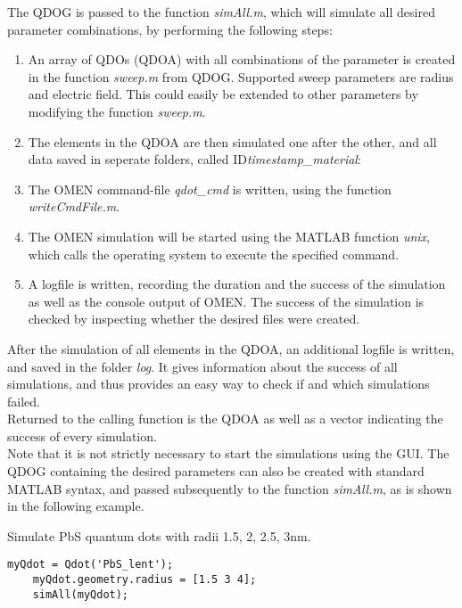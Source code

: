 The QDOG is passed to the function \textit{simAll.m}, which will simulate all desired parameter combinations, by performing the following steps:
\begin{enumerate}
	\item An array of QDOs (QDOA) with all combinations of the parameter is created in the function \textit{sweep.m} from QDOG. Supported sweep parameters are radius and electric field. This could easily be extended to other parameters by modifying the function \textit{sweep.m}.
	\item The elements in the QDOA are then simulated one after the other, and all data saved in seperate folders, called ID\textit{timestamp\_material}: 
	\item The OMEN command-file \textit{qdot\_cmd} is written, using the function \textit{writeCmdFile.m}.
	\item The OMEN simulation will be started using the MATLAB function \textit{unix}, which calls the operating system to execute the specified command.
	\item A logfile is written, recording the duration and the success of the simulation as well as the console output of OMEN. The success of the simulation is checked by inspecting whether the desired files were created.
\end{enumerate}
After the simulation of all elements in the QDOA, an additional logfile is written, and saved in the folder \textit{log}. It gives information about the success of all simulations, and thus provides an easy way to check if and which simulations failed.\\

Returned to the calling function is the QDOA as well as a vector indicating the success of every simulation.\\

Note that it is not strictly necessary to start the simulations using the GUI. The QDOG containing the desired parameters can also be created with standard MATLAB syntax, and passed subsequently to the function \textit{simAll.m}, as is shown in the following example.\\

\begin{EXAMPLE} Simulate PbS  quantum dots with radii 1.5, 2, 2.5, 3nm. 
\begin{lstlisting}[frame = none]
	myQdot = Qdot('PbS_lent');
	myQdot.geometry.radius = [1.5 3 4]; 
	simAll(myQdot);\end{lstlisting}
\end{EXAMPLE}


